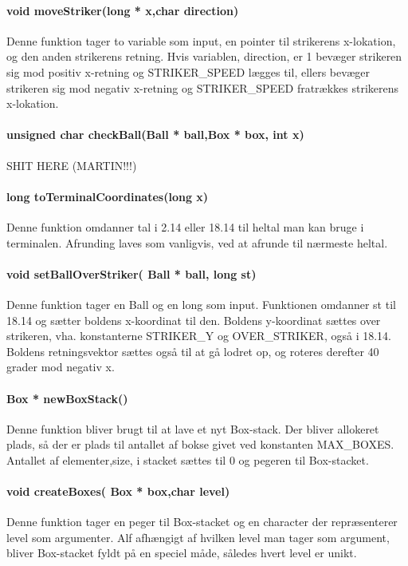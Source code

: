 \paragraph{void moveStriker(long * x,char direction)}
Denne funktion tager to variable som input, en pointer til strikerens x-lokation, og den anden strikerens retning. Hvis variablen, direction, er 1 bevæger strikeren sig mod positiv x-retning og STRIKER\_SPEED lægges til, ellers bevæger strikeren sig mod negativ x-retning og STRIKER\_SPEED fratrækkes strikerens x-lokation.
\paragraph{unsigned char checkBall(Ball * ball,Box * box,  int x)}
SHIT HERE (MARTIN!!!)
\paragraph{long toTerminalCoordinates(long x)}
Denne funktion omdanner tal i 2.14 eller 18.14 til heltal man kan bruge i terminalen. Afrunding laves som vanligvis, ved at afrunde til nærmeste heltal.

\paragraph{void setBallOverStriker( Ball * ball, long st)}
Denne funktion tager en Ball og en long som input.
Funktionen omdanner st til 18.14 og sætter boldens x-koordinat til den.
Boldens y-koordinat sættes over strikeren, vha. konstanterne STRIKER\_Y og OVER\_STRIKER, også i 18.14. Boldens retningsvektor sættes også til at gå lodret op, og roteres derefter 40 grader mod negativ x.
\paragraph{Box * newBoxStack()}
Denne funktion bliver brugt til at lave et nyt Box-stack. Der bliver allokeret plads, så der er plads til antallet af bokse givet ved konstanten MAX\_BOXES. Antallet af elementer,size, i stacket sættes til 0 og  pegeren til Box-stacket.
\paragraph{
void createBoxes( Box * box,char level)}
Denne funktion tager en peger til Box-stacket og en character der repræsenterer level som argumenter. Alf afhængigt af hvilken level man tager som argument, bliver Box-stacket fyldt på en speciel måde, således hvert level er unikt. 

